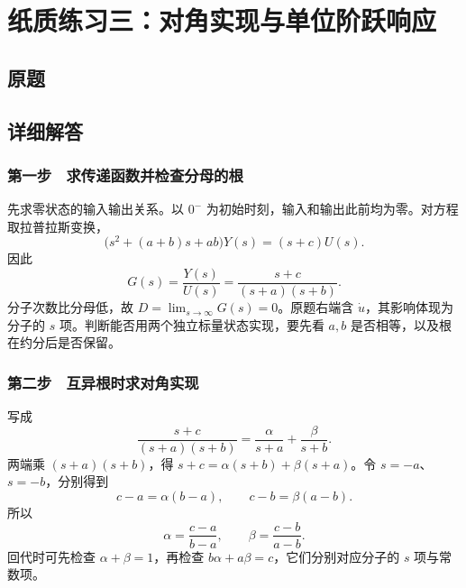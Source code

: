 \chapter{纸质练习三：对角实现与单位阶跃响应}

\section{原题}


\section{详细解答}

\subsection{第一步　求传递函数并检查分母的根}

先求零状态的输入输出关系。以 $0^-$ 为初始时刻，输入和输出此前均为零。对方程取拉普拉斯变换，
\[
 \bigl(s^2+(a+b)s+ab\bigr)Y(s)=(s+c)U(s).
\]
因此
\[
 G(s)=\frac{Y(s)}{U(s)}=\frac{s+c}{(s+a)(s+b)}.
\]
分子次数比分母低，故 $D=\lim_{s\to\infty}G(s)=0$。原题右端含 $\dot u$，其影响体现为分子的 $s$ 项。判断能否用两个独立标量状态实现，要先看 $a,b$ 是否相等，以及根在约分后是否保留。

\subsection{第二步　互异根时求对角实现}

写成
\[
 \frac{s+c}{(s+a)(s+b)}
 =\frac{\alpha}{s+a}+\frac{\beta}{s+b}.
\]
两端乘 $(s+a)(s+b)$，得 $s+c=\alpha(s+b)+\beta(s+a)$。令 $s=-a$、$s=-b$，分别得到
\[
 c-a=\alpha(b-a),\qquad c-b=\beta(a-b).
\]
所以
\[
 \alpha=\frac{c-a}{b-a},\qquad \beta=\frac{c-b}{a-b}.
\]
回代时可先检查 $\alpha+\beta=1$，再检查 $b\alpha+a\beta=c$，它们分别对应分子的 $s$ 项与常数项。

